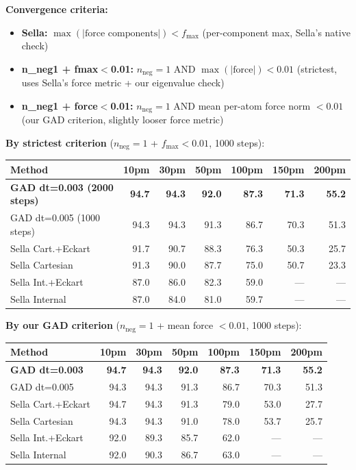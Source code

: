 \documentclass[11pt]{article}
\begin{document}
\textbf{Convergence criteria:}
\begin{itemize}[nosep,leftmargin=1.5em]
\item \textbf{Sella:} $\max(|\text{force components}|) < f_{\max}$ (per-component max, Sella's native check)
\item \textbf{n\_neg1 + fmax$<$0.01:} $n_{\text{neg}}\!=\!1$ AND $\max(|\text{force}|) < 0.01$ (strictest, uses Sella's force metric + our eigenvalue check)
\item \textbf{n\_neg1 + force$<$0.01:} $n_{\text{neg}}\!=\!1$ AND mean per-atom force norm $< 0.01$ (our GAD criterion, slightly looser force metric)
\end{itemize}

\vspace{0.3em}
\textbf{By strictest criterion} ($n_{\text{neg}}\!=\!1$ + $f_{\max} < 0.01$, 1000 steps):

\begin{tabular}{l*{6}{r}}
\toprule
Method & 10pm & 30pm & 50pm & 100pm & 150pm & 200pm \\
\midrule
\textbf{GAD dt=0.003 (2000 steps)} & \textbf{94.7} & \textbf{94.3} & \textbf{92.0} & \textbf{87.3} & \textbf{71.3} & \textbf{55.2} \\
GAD dt=0.005 (1000 steps)          & 94.3 & 94.3 & 91.3 & 86.7 & 70.3 & 51.3 \\
Sella Cart.+Eckart                 & 91.7 & 90.7 & 88.3 & 76.3 & 50.3 & 25.7 \\
Sella Cartesian                    & 91.3 & 90.0 & 87.7 & 75.0 & 50.7 & 23.3 \\
Sella Int.+Eckart                  & 87.0 & 86.0 & 82.3 & 59.0 & --- & --- \\
Sella Internal                     & 87.0 & 84.0 & 81.0 & 59.7 & --- & --- \\
\bottomrule
\end{tabular}

\vspace{0.3em}
\textbf{By our GAD criterion} ($n_{\text{neg}}\!=\!1$ + mean force $< 0.01$, 1000 steps):

\begin{tabular}{l*{6}{r}}
\toprule
Method & 10pm & 30pm & 50pm & 100pm & 150pm & 200pm \\
\midrule
\textbf{GAD dt=0.003}  & \textbf{94.7} & \textbf{94.3} & \textbf{92.0} & \textbf{87.3} & \textbf{71.3} & \textbf{55.2} \\
GAD dt=0.005           & 94.3 & 94.3 & 91.3 & 86.7 & 70.3 & 51.3 \\
Sella Cart.+Eckart     & 94.7 & 94.3 & 91.3 & 79.0 & 53.0 & 27.7 \\
Sella Cartesian        & 94.3 & 94.3 & 91.0 & 78.0 & 53.7 & 25.7 \\
Sella Int.+Eckart      & 92.0 & 89.3 & 85.7 & 62.0 & --- & --- \\
Sella Internal         & 92.0 & 90.3 & 86.7 & 63.0 & --- & --- \\
\bottomrule
\end{tabular}
\end{document}
